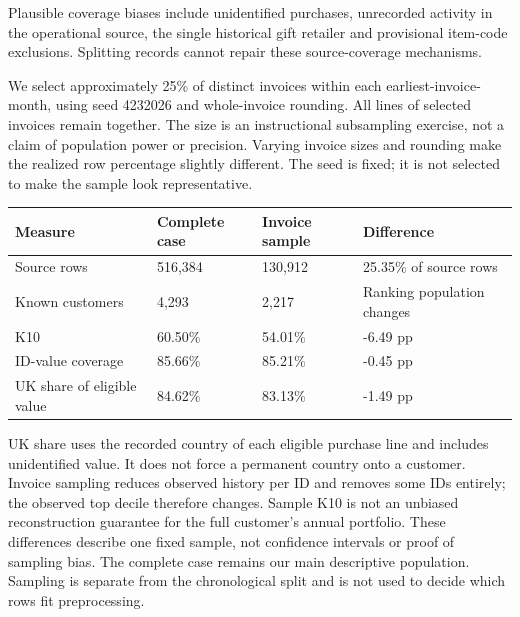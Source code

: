 \documentclass[10pt,a4paper]{article}
\begin{document}
Plausible coverage biases include unidentified purchases, unrecorded activity in the operational source, the single historical gift retailer and provisional item-code exclusions. Splitting records cannot repair these source-coverage mechanisms.

We select approximately 25\% of distinct invoices within each earliest-invoice-month, using seed 4232026 and whole-invoice rounding. All lines of selected invoices remain together. The size is an instructional subsampling exercise, not a claim of population power or precision. Varying invoice sizes and rounding make the realized row percentage slightly different. The seed is fixed; it is not selected to make the sample look representative.

\begin{tabularx}{\linewidth}{@{}YYYY@{}}
\toprule
\textbf{Measure} & \textbf{Complete case} & \textbf{Invoice sample} & \textbf{Difference} \\ \midrule
Source rows & 516,384 & 130,912 & 25.35\% of source rows \\
Known customers & 4,293 & 2,217 & Ranking population changes \\
K10 & 60.50\% & 54.01\% & -6.49 pp \\
ID-value coverage & 85.66\% & 85.21\% & -0.45 pp \\
UK share of eligible value & 84.62\% & 83.13\% & -1.49 pp \\
\bottomrule\end{tabularx}

UK share uses the recorded country of each eligible purchase line and includes unidentified value. It does not force a permanent country onto a customer. Invoice sampling reduces observed history per ID and removes some IDs entirely; the observed top decile therefore changes. Sample K10 is not an unbiased reconstruction guarantee for the full customer's annual portfolio. These differences describe one fixed sample, not confidence intervals or proof of sampling bias. The complete case remains our main descriptive population. Sampling is separate from the chronological split and is not used to decide which rows fit preprocessing.
\end{document}
